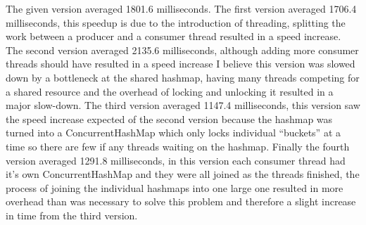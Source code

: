\documentclass[11pt, letterpaper]{article}
\begin{document}
The given version averaged 1801.6 milliseconds. The first version averaged 1706.4 milliseconds, this speedup is due to the introduction of threading, splitting the work between a producer and a consumer thread resulted in a speed increase. The second version averaged 2135.6 milliseconds, although adding more consumer threads should have resulted in a speed increase I believe this version was slowed down by a bottleneck at the shared hashmap, having many threads competing for a shared resource and the overhead of locking and unlocking it resulted in a major slow-down. The third version averaged 1147.4 milliseconds, this version saw the speed increase expected of the second version because the hashmap was turned into a ConcurrentHashMap which only locks individual ``buckets'' at a time so there are few if any threads waiting on the hashmap. Finally the fourth version averaged 1291.8 milliseconds, in this version each consumer thread had it's own ConcurrentHashMap and they were all joined as the threads finished, the process of joining the individual hashmaps into one large one resulted in more overhead than was necessary to solve this problem and therefore a slight increase in time from the third version.
\end{document}
